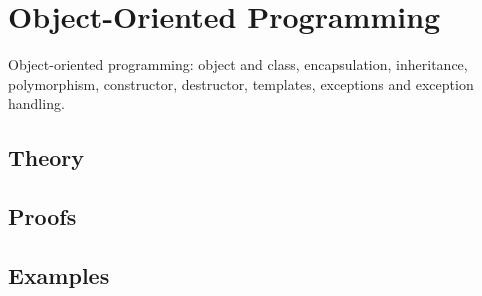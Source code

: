 
\section{Object-Oriented Programming}
\label{sec:1.3.09-oop}

\begin{ticket}
Object-oriented programming: object and class, encapsulation, inheritance, polymorphism, constructor, destructor, templates, exceptions and exception handling.
\end{ticket}

\subsection*{Theory}

\subsection*{Proofs}

\subsection*{Examples}
